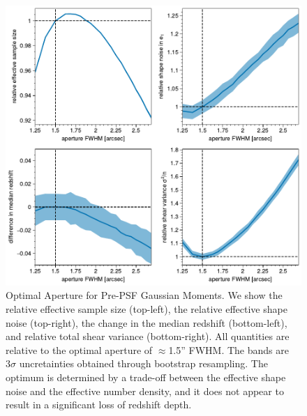 \documentclass[twocolappendix, appendixfloats, numberedappendix, twocolumn, apj]{openjournal}
\begin{document}
\begin{figure}
  \centering
  \includegraphics[width=\columnwidth]{figures/optap.pdf}
  \caption{
    Optimal Aperture for Pre-PSF Gaussian Moments. We show the relative effective sample
    size (top-left), the relative effective shape noise (top-right), the change in the median
    redshift (bottom-left), and relative total shear variance (bottom-right). All quantities are
    relative to the optimal aperture of $\approx$1.5'' FWHM. The bands are $3\sigma$ uncretainties
    obtained through bootstrap resampling. The optimum is determined by a trade-off
    between the effective shape noise and the effective number density, and it does not appear to
    result in a significant loss of redshift depth.
    \label{fig:opap}
  }
\end{figure}
\end{document}
